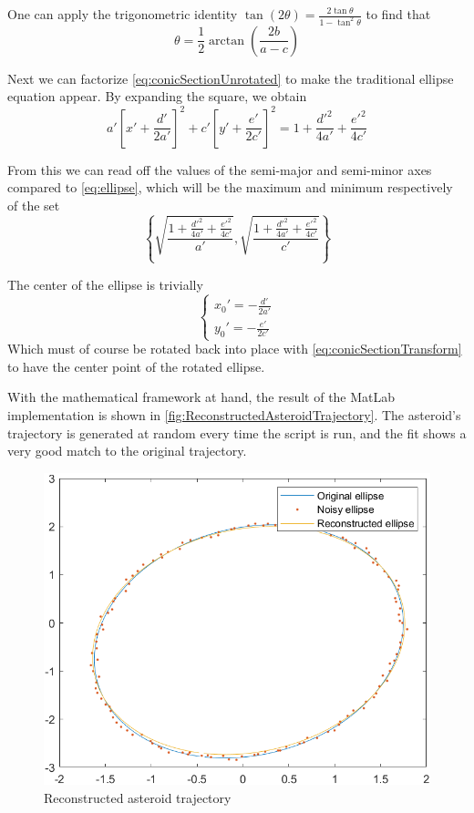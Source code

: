 One can apply the trigonometric identity $\tan(2\theta) = \frac{2\tan\theta}{1 - \tan^2\theta}$ to find that
\begin{equation}
    \theta = \frac{1}{2} \arctan \left( \frac{2b}{a - c} \right)
\end{equation}

Next we can factorize \autoref{eq:conicSectionUnrotated} to make the traditional ellipse equation appear. By expanding the square, we obtain
\begin{equation}
    a' \left[ x' + \frac{d'}{2a'}\right]^2 + c' \left[ y' + \frac{e'}{2c'}\right]^2 = 1 + \frac{d'^2}{4 a'} + \frac{e'^2}{4 c'}
\end{equation}

From this we can read off the values of the semi-major and semi-minor axes compared to \autoref{eq:ellipse}, which will be the maximum and minimum respectively of the set 
\begin{equation}
    \left\{ \sqrt{\frac{1 + \frac{d'^2}{4 a'} + \frac{e'^2}{4 c'}}{a'}}, \sqrt{\frac{1 + \frac{d'^2}{4 a'} + \frac{e'^2}{4 c'}}{c'}}  \right\} 
\end{equation}

The center of the ellipse is trivially
\begin{equation}
    \begin{cases}
        x_0' = -\frac{d'}{2a'} \\
        y_0' = -\frac{e'}{2c'}
    \end{cases}
\end{equation}
Which must of course be rotated back into place with \autoref{eq:conicSectionTransform} to have the center point of the rotated ellipse.

With the mathematical framework at hand, the result of the MatLab implementation is shown in \autoref{fig:ReconstructedAsteroidTrajectory}. The asteroid's trajectory is generated at random every time the script is run, and the fit shows a very good match to the original trajectory.
\begin{figure}[!ht]
    \centering
    \includegraphics[width=0.5\linewidth]{Doc/Graphics/Part3/ReconstructedAsteroidTrajectory.png}
    \caption{Reconstructed asteroid trajectory}
    \label{fig:ReconstructedAsteroidTrajectory}
\end{figure}
\FloatBarrier

